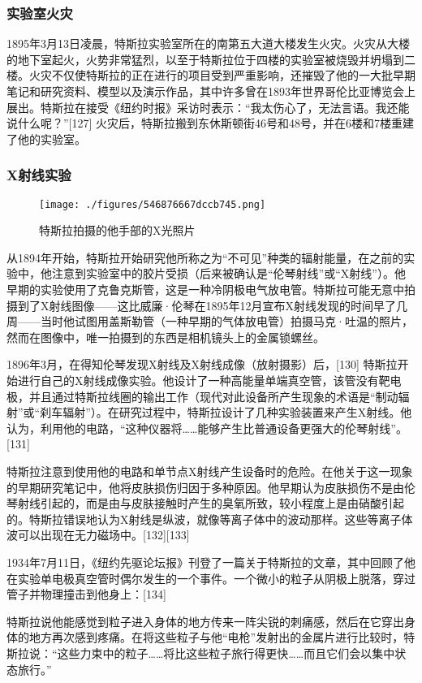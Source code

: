 \subsubsection{实验室火灾}  
1895年3月13日凌晨，特斯拉实验室所在的南第五大道大楼发生火灾。火灾从大楼的地下室起火，火势非常猛烈，以至于特斯拉位于四楼的实验室被烧毁并坍塌到二楼。火灾不仅使特斯拉的正在进行的项目受到严重影响，还摧毁了他的一大批早期笔记和研究资料、模型以及演示作品，其中许多曾在1893年世界哥伦比亚博览会上展出。特斯拉在接受《纽约时报》采访时表示：“我太伤心了，无法言语。我还能说什么呢？”[127] 火灾后，特斯拉搬到东休斯顿街46号和48号，并在6楼和7楼重建了他的实验室。
\subsubsection{X射线实验}
\begin{figure}[ht]
\centering
\texttt{[image: ./figures/546876667dccb745.png]}
\caption{特斯拉拍摄的他手部的X光照片} \label{fig_Tesla_18}
\end{figure}
从1894年开始，特斯拉开始研究他所称之为“不可见”种类的辐射能量，在之前的实验中，他注意到实验室中的胶片受损（后来被确认是“伦琴射线”或“X射线”）。他早期的实验使用了克鲁克斯管，这是一种冷阴极电气放电管。特斯拉可能无意中拍摄到了X射线图像——这比威廉·伦琴在1895年12月宣布X射线发现的时间早了几周——当时他试图用盖斯勒管（一种早期的气体放电管）拍摄马克·吐温的照片，然而在图像中，唯一拍摄到的东西是相机镜头上的金属锁螺丝。

1896年3月，在得知伦琴发现X射线及X射线成像（放射摄影）后，[130] 特斯拉开始进行自己的X射线成像实验。他设计了一种高能量单端真空管，该管没有靶电极，并且通过特斯拉线圈的输出工作（现代对此设备所产生现象的术语是“制动辐射”或“刹车辐射”）。在研究过程中，特斯拉设计了几种实验装置来产生X射线。他认为，利用他的电路，“这种仪器将……能够产生比普通设备更强大的伦琴射线”。[131]

特斯拉注意到使用他的电路和单节点X射线产生设备时的危险。在他关于这一现象的早期研究笔记中，他将皮肤损伤归因于多种原因。他早期认为皮肤损伤不是由伦琴射线引起的，而是由与皮肤接触时产生的臭氧所致，较小程度上是由硝酸引起的。特斯拉错误地认为X射线是纵波，就像等离子体中的波动那样。这些等离子体波可以出现在无力磁场中。[132][133]

1934年7月11日，《纽约先驱论坛报》刊登了一篇关于特斯拉的文章，其中回顾了他在实验单电极真空管时偶尔发生的一个事件。一个微小的粒子从阴极上脱落，穿过管子并物理撞击到他身上：[134]

特斯拉说他能感觉到粒子进入身体的地方传来一阵尖锐的刺痛感，然后在它穿出身体的地方再次感到疼痛。在将这些粒子与他“电枪”发射出的金属片进行比较时，特斯拉说：“这些力束中的粒子……将比这些粒子旅行得更快……而且它们会以集中状态旅行。”
